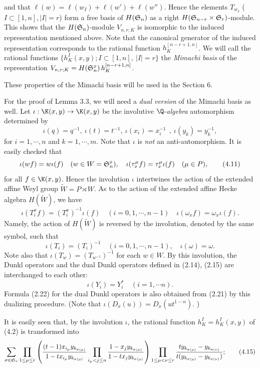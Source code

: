 and that $\ell(w)=\ell(w_I)+\ell(w')+\ell(w'')$.  
Hence the elements $T_{w_I}$ ($I\subset[1,n], |I|=r$) 
form a free basis of $H(\frak{S}_n)$ as a right 
$H(\frak{S}_{n-r}\times\frak{S}_r)$-module.
This shows that the $H(\frak{S}_n)$-module $V_{n,r;K}$ is isomorphic 
to the induced representation mentioned above. 
Note that the canonical generator of the induced representation 
corresponds to the rational function $h^{[n-r+1,n]}_{K}$. 
We will call the rational functions 
$\{h^{I}_{K}(x,y); I\subset[1,n],\ |I|=r\}$ 
the {\it Mimachi basis} of 
the representation $V_{n,r;K}=H(\frak{S}^x_n) \, h^{[n-r+1,n]}_{K}$. 
\par
These properties of the Mimachi basis will be used in the Section 6. 
%
\par\medpagebreak\par
For the proof of Lemma 3.3, we will need a {\it dual version} of the Mimachi 
basis as well. 
Let $\iota : \K(x,y)\to\K(x,y)$ be the involutive $\Q$-{\it algebra} automorphism 
determined by 
$$
\iota(q)=q^{-1}, \ \iota(t)=t^{-1}, \ \iota(x_i)=x_i^{-1}\ \ , \ \iota(y_k)=y_k^{-1},
\tag{4.10}
$$
for $i=1,\cdots,n$ and $k=1,\cdots,m$.  
Note that $\iota$ is {\it not} an anti-automorphism. 
It is easily checked that
$$
\iota(w f)=w \iota(f) \quad (w\in W=\frak{S}^x_n),\quad 
\iota(\tau_x^\mu f) =\tau_x^\mu \iota(f)\quad (\mu\in P),
\tag{4.11}
$$
for all $f\in\K(x,y)$. 
Hence the involution $\iota$ intertwines the action of the extended affine Weyl group
$\widetilde{W}=P\rtimes W$.  
As to the action of the extended affine Hecke algebra $H(\widetilde{W})$, 
we have
$$
\iota(T^x_i f)= (T^x_i)^{-1}\iota(f)\quad(i=0,1,\cdots,n-1)
\quad \iota(\omega_x f)=\omega_x\iota(f). 
\tag{4.12}
$$
Namely, the action of $H(\widetilde{W})$ is reversed by the involution, 
denoted by the same symbol, such that
$$
\iota(T_i)=(T_i)^{-1}\quad (i=0,1,\cdots,n-1),\quad \iota(\omega)=\omega. 
\tag{4.13}
$$
Note also that $\iota(T_w)=(T_{w^{-1}})^{-1}$ for each $w\in W$. 
By this involution, the Dunkl operators and the dual Dunkl operators 
defined in (2.14), (2.15) are interchanged to each other: 
$$
 \iota(Y_i)=Y^\ast_i\quad (i=1,\cdots n). 
\tag{4.14}
$$
Formula (2.22) for the dual Dunkl operators is also obtained from (2.21) by 
this dualizing procedure. 
(Note that $\iota(D_x(u))=D_x(ut^{1-n})$. )
\par
It is easily seen that, by the involution $\iota$, the rational function 
$h^I_K=h^I_K(x,y)$ of (4.2) is transformed into 
$$
\sum_{\sigma\in\frak{S}_r}
\prod_{1\le\mu\le r}\left(
\frac{(t-1)x_{i_\mu}y_{k_{\sigma(\mu)}}}{1-tx_{i_\mu}y_{k_{\sigma(\mu)}}}
\prod_{i_\mu<j\le n}
\frac{1-x_jy_{k_{\sigma(\mu)}}}{1-tx_jy_{k_{\sigma(\mu)}}}\right)
\prod_{1\le\mu<\nu\le r} 
\frac{ty_{k_{\sigma(\mu)}}-y_{k_{\sigma(\nu)}}}
{t(y_{k_{\sigma(\mu)}}-y_{k_{\sigma(\nu)}})};
\tag{4.15}
$$
